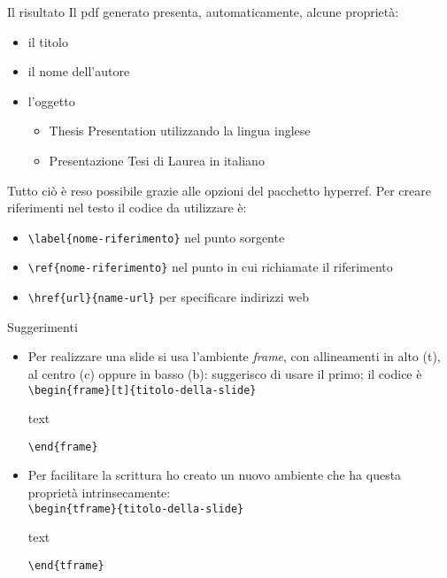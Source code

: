 \begin{frame}[t,fragile]{Il risultato}
Il pdf generato presenta, automaticamente, alcune proprietà:
\begin{itemize}
\item il titolo
\item il nome dell'autore
\item l'oggetto
\begin{itemize}
\item Thesis Presentation utilizzando la lingua inglese
\item Presentazione Tesi di Laurea in italiano
\end{itemize}
\end{itemize}
Tutto ciò è reso possibile grazie alle opzioni del pacchetto hyperref. Per creare riferimenti nel testo il codice da utilizzare è:
\begin{itemize}
\item \verb!\label{nome-riferimento}! nel punto sorgente
\item \verb!\ref{nome-riferimento}! nel punto in cui richiamate il riferimento
\item \verb!\href{url}{name-url}! per specificare indirizzi web
\end{itemize}
\end{frame}


\begin{frame}[fragile]{Suggerimenti}
\begin{itemize}
\item Per realizzare una slide si usa l'ambiente \emph{frame}, con allineamenti in alto (t), al centro (c) oppure in basso (b): suggerisco di usare il primo; il codice è\\
\verb!\begin{frame}[t]{titolo-della-slide}!
\begin{flushleft}
text
\end{flushleft}
\verb!\end{frame}!
\item Per facilitare la scrittura ho creato un nuovo ambiente che ha questa proprietà intrinsecamente:\\
\verb!\begin{tframe}{titolo-della-slide}!
\begin{flushleft}
text
\end{flushleft}
\verb!\end{tframe}!
\end{itemize}
\end{frame}

